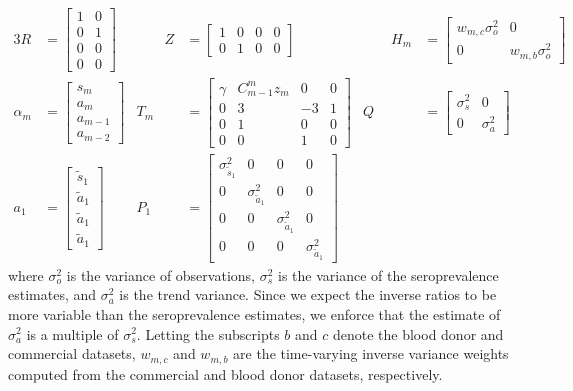 \begin{alignat*}{3}
R &= \begin{bmatrix}
1 & 0  \\ 
0 & 1 \\ 
0 & 0 \\ 
0 & 0 
\end{bmatrix} &\qquad 
Z &= \begin{bmatrix}
1 & 0 & 0 & 0 \\ 
0 & 1 & 0 & 0 
\end{bmatrix} &\qquad 
H_m &= \begin{bmatrix} %
w_{m,c}\sigma^2_o & 0 \\ 
0 & w_{m,b}\sigma^2_o
\end{bmatrix} \\
\alpha_m &= \begin{bmatrix}
s_{m}\\
a_m\\ 
a_{m-1}\\ 
a_{m-2}
\end{bmatrix} & 
T_m &= \begin{bmatrix}
 \gamma & C_{m-1}^m z_m & 0 & 0\\ 
 0 & 3 & -3 & 1 \\ 
 0 & 1 & 0 & 0\\ 
 0 & 0 & 1 & 0
\end{bmatrix}  & 
Q &= \begin{bmatrix} 
\sigma^2_s & 0  \\ 
0 & \sigma^2_a
\end{bmatrix} \\
a_1 &= \begin{bmatrix}
\tilde{s}_{1}\\ 
\tilde{a}_1\\ 
\tilde{a}_1 \\
\tilde{a}_1
\end{bmatrix} & 
P_{1} &= \begin{bmatrix}
\sigma^2_{\tilde{s}_{1}} & 0 & 0 & 0 \\ 
0 & \sigma^2_{\tilde{a}_1} & 0 & 0\\ 
0 & 0 & \sigma^2_{\tilde{a}_1} & 0 \\ 
0 & 0 & 0 & \sigma^2_{\tilde{a}_1}
\end{bmatrix} 
\end{alignat*}
where $\sigma^2_o$ is the variance of observations, $\sigma^2_s$ is the variance
of the seroprevalence estimates, and $\sigma^2_a$ is the trend variance. Since
we expect the inverse ratios to be more variable than the seroprevalence
estimates, we enforce that the estimate of $\sigma^2_a$ is a multiple of
$\sigma^2_s$. Letting the subscripts $b$ and $c$ denote the blood donor and
commercial datasets, $w_{m,c}$ and $w_{m,b}$ are the time-varying inverse
variance weights computed from the commercial and blood donor datasets,
respectively. 

